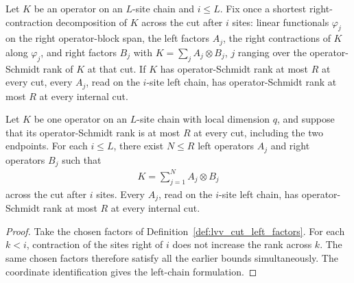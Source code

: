 \begin{definition}
    \label{def:lvv_cut_left_factors}
    \leanok
    Let $K$ be an operator on an $L$-site chain and $i\le L$. Fix once a
    shortest right-contraction decomposition of $K$ across the cut after $i$
    sites: linear functionals $\varphi_j$ on the right operator-block span,
    the left factors $A_j$, the right contractions of $K$ along $\varphi_j$,
    and right factors $B_j$ with $K=\sum_jA_j\otimes B_j$, $j$ ranging over
    the operator-Schmidt rank of $K$ at that cut. If $K$ has operator-Schmidt
    rank at most $R$ at every cut, every $A_j$, read on the $i$-site left
    chain, has operator-Schmidt rank at most $R$ at every internal cut.
\end{definition}

\begin{lemma}
    \label{thm:lvv_cut_decomposition}
    \leanok
    Let $K$ be one operator on an $L$-site chain with local dimension $q$,
    and suppose that its operator-Schmidt rank is at most $R$ at every cut,
    including the two endpoints. For each $i\le L$, there exist $N\le R$
    left operators $A_j$ and right operators $B_j$ such that
    \begin{align}
        K=\sum_{j=1}^N A_j\otimes B_j
    \end{align}
    across the cut after $i$ sites. Every $A_j$, read on the $i$-site left
    chain, has operator-Schmidt rank at most $R$ at every internal cut.
\end{lemma}
\begin{proof}
    \leanok
    Take the chosen factors of Definition~\ref{def:lvv_cut_left_factors}. For each
    $k<i$, contraction of the sites right of $i$ does not increase the rank
    across $k$. The same chosen factors therefore satisfy all the earlier
    bounds simultaneously. The coordinate identification gives the left-chain
    formulation.
\end{proof}
